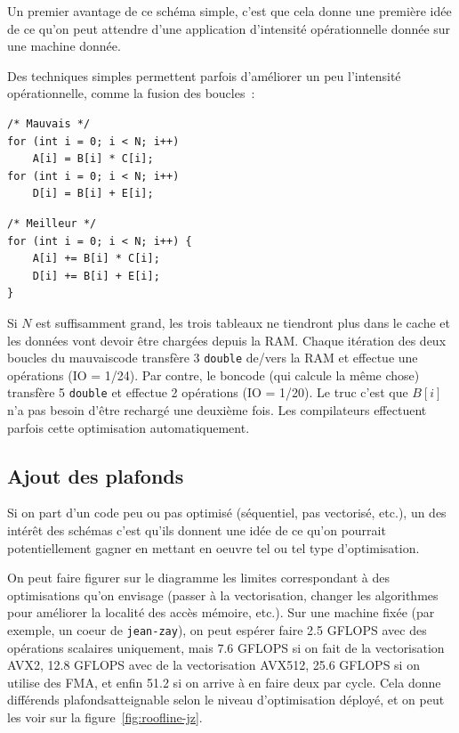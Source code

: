Un premier avantage de ce schéma simple, c'est que cela donne une première idée
de ce qu'on peut attendre d'une application d'intensité opérationnelle donnée
sur une machine donnée.

Des techniques simples permettent parfois d'améliorer un peu l'intensité
opérationnelle, comme la fusion des boucles~:

\smallskip

\begin{minipage}{0.49\textwidth}
\begin{verbatim}
/* Mauvais */
for (int i = 0; i < N; i++)
    A[i] = B[i] * C[i];
for (int i = 0; i < N; i++)
    D[i] = B[i] + E[i];
\end{verbatim}
\end{minipage}%
\begin{minipage}{0.49\textwidth}
\begin{verbatim}
/* Meilleur */
for (int i = 0; i < N; i++) {
    A[i] += B[i] * C[i];
    D[i] += B[i] + E[i];
}
\end{verbatim}
\end{minipage}

\medskip

Si $N$ est suffisamment grand, les trois tableaux ne tiendront plus dans le
cache et les données vont devoir être chargées depuis la RAM. Chaque itération
des deux boucles du \og mauvais\fg code transfère 3 \texttt{double} de/vers la
RAM et effectue une opérations (IO = 1/24). Par contre, le \og bon\fg code (qui
calcule la même chose) transfère 5 \texttt{double} et effectue 2 opérations (IO
= 1/20). Le truc c'est que $B[i]$ n'a pas besoin d'être rechargé une deuxième
fois. Les compilateurs effectuent parfois cette optimisation automatiquement.

\subsection{Ajout des \og plafonds\fg}

Si on part d'un code peu ou pas optimisé (séquentiel, pas vectorisé, etc.), un
des intérêt des schémas  c'est qu'ils donnent une idée de ce
qu'on pourrait potentiellement gagner en mettant en oeuvre tel ou tel type
d'optimisation.

On peut faire figurer sur le diagramme les limites correspondant à des
optimisations qu'on envisage (passer à la vectorisation, changer les algorithmes
pour améliorer la localité des accès mémoire, etc.). Sur une machine fixée (par
exemple, un coeur de \texttt{jean-zay}), on peut espérer faire 2.5 GFLOPS avec
des opérations scalaires uniquement, mais 7.6 GFLOPS si on fait de la
vectorisation AVX2, 12.8 GFLOPS avec de la vectorisation AVX512, 25.6 GFLOPS si
on utilise des FMA, et enfin 51.2 si on arrive à en faire deux par cycle. Cela
donne différends \og plafonds\fg atteignable selon le niveau d'optimisation
déployé, et on peut les voir sur la figure~\ref{fig:roofline-jz}.

